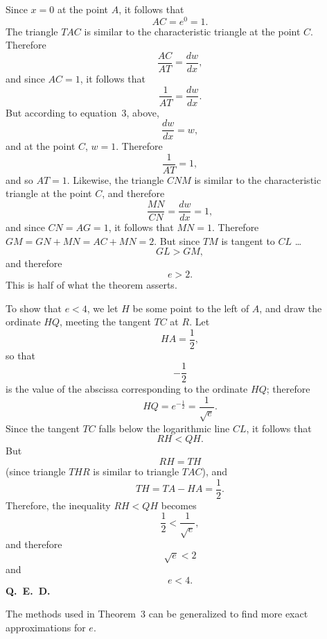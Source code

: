 \documentclass[polutonikogreek,english,twoside,openright]{article}
\begin{document}

Since $x=0$ at the point $A$, it follows that 
\[AC = e^0 = 1.\]
The triangle $TAC$ is similar to the characteristic triangle at the point $C$.  Therefore 
\[\frac{AC}{AT} =  \frac{dw}{dx},\]
and since $AC  =1$, it follows that 
\[\frac{1}{AT}= \frac{dw}{dx}.\]
But according to equation~3, above, 
\[\frac{dw}{dx} = w,\]
and at the point $C$, $w=1$.
Therefore 
\[\frac{1}{AT} = 1,\]
and so $AT =1$.
Likewise, the triangle $CNM$ is similar to the characteristic triangle at the point $C$, and therefore
\[\frac{MN}{CN} = \frac{dw}{dx} = 1,\]
and since $CN = AG =1$, it follows that $MN =1$.
Therefore $GM = GN + MN = AC + MN = 2$.  But since $TM$ is tangent to $CL$ \ldots
$$GL > GM,$$
and therefore 
$$e>2.$$  This is half of what the theorem asserts.

To show that $e<4$, we let $H$ be some point to the left of $A$, and draw the ordinate $HQ$, meeting the tangent $TC$ at $R$.    Let 
$$HA = \frac{1}{2},$$ so that 
$$-\frac{1}{2}$$
 is the value of the abscissa corresponding to the ordinate $HQ$; therefore 
$$HQ = e^{-\frac{1}{2}} = \frac{1}{\sqrt{e}}.$$
Since the tangent $TC$ falls below the logarithmic line $CL$, it follows that
$$RH <QH.$$
But 
$$RH = TH$$
(since triangle $THR$ is similar to triangle $TAC$),
and 
$$TH = TA - HA = \frac{1}{2}.$$
Therefore, the inequality $RH < QH$ becomes
$$\frac{1}{2}  < \frac{1}{\sqrt{e}},$$
and therefore
$$\sqrt{e} < 2$$
and 
$$e <4.$$ {\bf Q.\ E.\ D.}

The methods used in Theorem~3 can be generalized to find more exact approximations for $e$.


\end{document}
